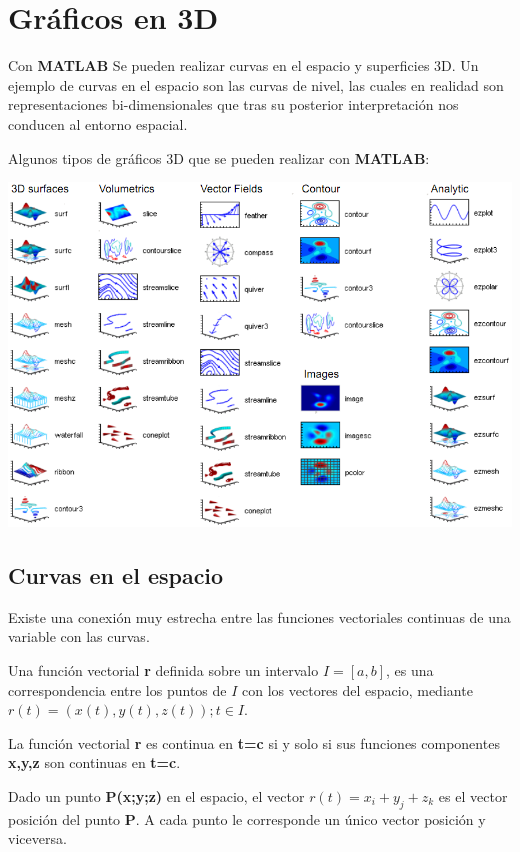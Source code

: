 \chapter{Gráficos en 3D}

Con \textbf{MATLAB} Se pueden realizar curvas en el espacio y superficies 3D. Un ejemplo de curvas en el espacio son las curvas de nivel, las cuales en realidad son representaciones bi-dimensionales que tras su posterior interpretación nos conducen al entorno espacial.

Algunos tipos de gráficos 3D que se pueden realizar con \textbf{MATLAB}:
\begin{center}
\includegraphics[width=450pt]{./Imagenes/graficos3d.png}
\end{center}

\section{Curvas en el espacio}

Existe una conexión muy estrecha entre las funciones vectoriales continuas de una variable con 
las curvas.

Una función vectorial \textbf{r} definida sobre un intervalo $I=[a,b]$, es una correspondencia entre los puntos de $I$ con los vectores del espacio, mediante $r(t)=(x(t),y(t),z(t)); t \in I$.

La función vectorial \textbf{r} es continua en \textbf{t=c} si y solo si sus funciones componentes \textbf{x,y,z} son continuas en \textbf{t=c}.

Dado un punto \textbf{P(x;y;z)} en el espacio, el vector $r(t)=x_{i}+y_{j}+z_{k}$ es el vector posición del punto \textbf{P}. A cada punto le corresponde un único vector posición y viceversa. 

